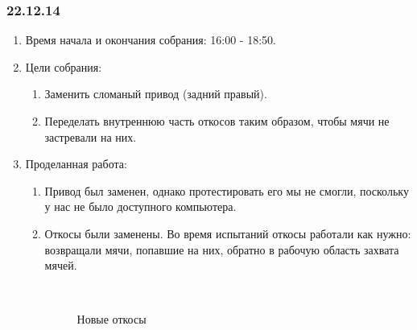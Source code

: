 \subsubsection{22.12.14}
\begin{enumerate}
	
	\item Время начала и окончания собрания: 16:00 - 18:50.
	
	\item Цели собрания: 
	\begin{enumerate}
		
		\item Заменить сломаный привод (задний правый).
		
		\item Переделать внутреннюю часть откосов таким образом, чтобы мячи не застревали на них.
		
	\end{enumerate}

	\item Проделанная работа:
	\begin{enumerate}
		
		\item Привод был заменен, однако протестировать его мы не смогли, поскольку у нас не было доступного компьютера.
		
        \item Откосы были заменены. Во время испытаний откосы работали как нужно: возвращали мячи, попавшие на них, обратно в рабочую область захвата мячей.
		
        \begin{figure}[H]
	  	  \begin{minipage}[h]{0.2\linewidth}
	  	    \center  
	  	  \end{minipage}
	  	  \begin{minipage}[h]{0.6\linewidth}
	  		\caption{Новые откосы}
	  	  \end{minipage}
	   \end{figure}


\end{enumerate}
\end{enumerate}
